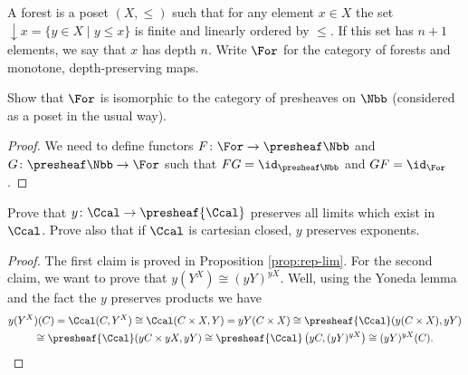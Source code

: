 \begin{exercise}{8.3}
    A forest is a poset $(X,\leq)$ such that for any element $x\in X$ the set $\downarrow x=\{y\in X\mid y\leq x\}$ is finite and linearly ordered by $\leq$.
    If this set has $n+1$ elements, we say that $x$ has depth $n$. Write $\For$ for the category of forests and monotone, depth-preserving maps.

    Show that $\For$ is isomorphic to the category of presheaves on $\Nbb$ (considered as a poset in the usual way).
\end{exercise}
\begin{solution}
    \begin{proof}
        We need to define functors $F\colon\For\to\presheaf\Nbb$ and $G\colon\presheaf\Nbb\to\For$ such that $FG=\id_{\presheaf\Nbb}$ and $GF=\id_{\For}$.
    \end{proof}
\end{solution}

\begin{exercise}{59}
    Prove that $y\colon\Ccal\to\presheaf{\Ccal}$ preserves all limits which exist in $\Ccal$. 
    Prove also that if $\Ccal$ is cartesian closed, $y$ preserves exponents.
\end{exercise}
\begin{solution}
    \begin{proof}
        The first claim is proved in Proposition \ref{prop:rep-lim}. 
        For the second claim, we want to prove that $y(Y^X)\cong (yY)^{yX}$.
        Well, using the Yoneda lemma and the fact the $y$ preserves products we have
        \begin{multline*}
            y(Y^X)(C)=\Ccal(C, Y^X)\cong\Ccal(C\times X, Y)=yY(C\times X)\cong\presheaf{\Ccal}(y(C\times X), yY)\\\cong\presheaf{\Ccal}(yC\times yX, yY)\cong\presheaf{\Ccal}\left(yC,(yY)^{yX}\right)\cong (yY)^{yX}(C).
        \end{multline*}
    \end{proof}
\end{solution}